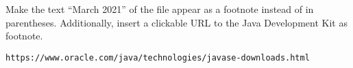 Make the text \enquote{March 2021} of the file 
 appear as a footnote instead of in 
parentheses. Additionally, insert a clickable URL to the Java Development Kit 
as footnote.

\texttt{https://www.oracle.com/java/technologies/javase-downloads.html}

